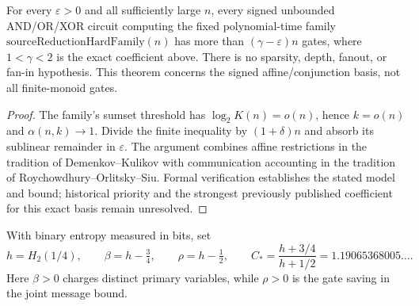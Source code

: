 \begin{theorem}
  \label{thm:lowerbounds-algebraic-geometry-explicit}
  \leanok
  For every $\varepsilon>0$ and all sufficiently large $n$, every signed
  unbounded AND/OR/XOR circuit computing the fixed polynomial-time family
  $\mathrm{sourceReductionHardFamily}(n)$ has more than
  $(\gamma-\varepsilon)n$ gates, where $1<\gamma<2$ is the exact coefficient
  above. There is no sparsity, depth, fanout, or fan-in hypothesis. This theorem
  concerns the signed affine/conjunction basis, not all finite-monoid gates.
\end{theorem}
\begin{proof}
  \leanok
  The family's sumset threshold has $\log_2K(n)=o(n)$, hence $k=o(n)$ and
  $\alpha(n,k)\to1$. Divide the finite inequality by $(1+\delta)n$ and absorb
  its sublinear remainder in $\varepsilon$. The argument combines affine
  restrictions in the tradition of Demenkov--Kulikov with communication
  accounting in the tradition of Roychowdhury--Orlitsky--Siu. Formal verification
  establishes the stated model and bound; historical priority and the strongest
  previously published coefficient for this exact basis remain unresolved.
\end{proof}

\begin{definition}
  \label{def:lowerbounds-algebraic-geometry-joint-coefficient}
  \leanok
  With binary entropy measured in bits, set
  \[
    h=H_2(1/4),\qquad \beta=h-\tfrac34,\qquad \rho=h-\tfrac12,
    \qquad C_* = \frac{h+3/4}{h+1/2}=1.19065368005\ldots.
  \]
  Here $\beta>0$ charges distinct primary variables, while $\rho>0$ is the
  gate saving in the joint message bound.
\end{definition}

